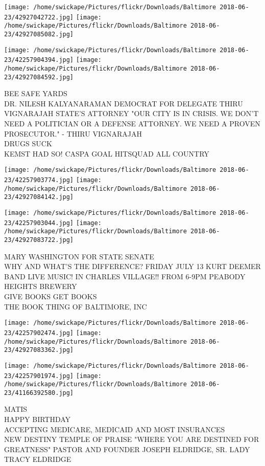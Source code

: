 \documentclass[10pt,letterpaper]{article}
\begin{document}
\texttt{[image: /home/swickape/Pictures/flickr/Downloads/Baltimore 2018-06-23/42927042722.jpg]}
\texttt{[image: /home/swickape/Pictures/flickr/Downloads/Baltimore 2018-06-23/42927085082.jpg]}

\texttt{[image: /home/swickape/Pictures/flickr/Downloads/Baltimore 2018-06-23/42257904394.jpg]}
\texttt{[image: /home/swickape/Pictures/flickr/Downloads/Baltimore 2018-06-23/42927084592.jpg]}

BEE SAFE YARDS\\
DR. NILESH KALYANARAMAN DEMOCRAT FOR DELEGATE THIRU VIGNARAJAH STATE'S ATTORNEY "OUR CITY IS IN CRISIS.  WE DON'T NEED A POLITICIAN OR A DEFENSE ATTORNEY.  WE NEED A PROVEN PROSECUTOR." {-} THIRU VIGNARAJAH\\
DRUGS SUCK\\
KEMST HAD SO!  CASPA GOAL HITSQUAD ALL COUNTRY\\
\pagebreak

\texttt{[image: /home/swickape/Pictures/flickr/Downloads/Baltimore 2018-06-23/42257903774.jpg]}
\texttt{[image: /home/swickape/Pictures/flickr/Downloads/Baltimore 2018-06-23/42927084142.jpg]}

\texttt{[image: /home/swickape/Pictures/flickr/Downloads/Baltimore 2018-06-23/42257903044.jpg]}
\texttt{[image: /home/swickape/Pictures/flickr/Downloads/Baltimore 2018-06-23/42927083722.jpg]}

MARY WASHINGTON FOR STATE SENATE\\
WHY AND WHAT'S THE DIFFERENCE?  FRIDAY JULY 13 KURT DEEMER BAND LIVE MUSIC!  IN CHARLES VILLAGE!!  FROM 6{-}9PM PEABODY HEIGHTS BREWERY\\
GIVE BOOKS GET BOOKS\\
THE BOOK THING OF BALTIMORE, INC\\
\pagebreak

\texttt{[image: /home/swickape/Pictures/flickr/Downloads/Baltimore 2018-06-23/42257902474.jpg]}
\texttt{[image: /home/swickape/Pictures/flickr/Downloads/Baltimore 2018-06-23/42927083362.jpg]}

\texttt{[image: /home/swickape/Pictures/flickr/Downloads/Baltimore 2018-06-23/42257901974.jpg]}
\texttt{[image: /home/swickape/Pictures/flickr/Downloads/Baltimore 2018-06-23/41166392580.jpg]}

MATIS\\
HAPPY BIRTHDAY\\
ACCEPTING MEDICARE, MEDICAID AND MOST INSURANCES\\
NEW DESTINY TEMPLE OF PRAISE "WHERE YOU ARE DESTINED FOR GREATNESS"  PASTOR AND FOUNDER JOSEPH ELDRIDGE, SR.  LADY TRACY ELDRIDGE\\
\pagebreak
\end{document}
